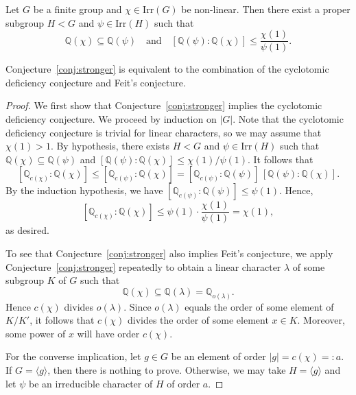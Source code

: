 \documentclass[10pt,a4paper]{amsart}
\newcommand{\Irr}{{\mathrm {Irr}}}
\newcommand{\QQ}{{\mathbb Q}}
\begin{document}
\begin{conjecture}\label{conj:stronger}
Let $G$ be a finite group and $\chi\in\Irr(G)$ be non-linear. Then
there exist a proper subgroup $H<G$ and $\psi\in\Irr(H)$ such that
\[
\QQ(\chi) \subseteq \QQ(\psi) \quad \text{and} \quad [\QQ(\psi) :
\QQ(\chi)] \le \frac{\chi(1)}{\psi(1)}.
\]
\end{conjecture}

\begin{proposition}\label{prop:1}
Conjecture~\ref{conj:stronger} is equivalent to the combination of
the cyclotomic deficiency conjecture and Feit's conjecture.
\end{proposition}

\begin{proof}
We first show that Conjecture~\ref{conj:stronger} implies the
cyclotomic deficiency conjecture. We proceed by induction on $|G|$.
Note that the cyclotomic deficiency conjecture is trivial for linear
characters, so we may assume that $\chi(1) > 1$. By hypothesis,
there exists $H < G$ and $\psi \in \Irr(H)$ such that $\QQ(\chi)
\subseteq \QQ(\psi)$ and $[\QQ(\psi) : \QQ(\chi)] \le
\chi(1)/\psi(1)$. It follows that
\[
[\QQ_{c(\chi)} : \QQ(\chi)] \le [\QQ_{c(\psi)} : \QQ(\chi)] =
[\QQ_{c(\psi)} : \QQ(\psi)] \, [\QQ(\psi) : \QQ(\chi)].
\]
By the induction hypothesis, we have $[\QQ_{c(\psi)} : \QQ(\psi)]
\le \psi(1)$. Hence,
\[
[\QQ_{c(\chi)} : \QQ(\chi)] \le \psi(1) \cdot
\frac{\chi(1)}{\psi(1)} = \chi(1),
\]
as desired.

To see that Conjecture~\ref{conj:stronger} also implies Feit's
conjecture, we apply Conjecture~\ref{conj:stronger} repeatedly to
obtain a linear character $\lambda$ of some subgroup $K$ of $G$ such
that
\[
\mathbb{Q}(\chi) \subseteq \mathbb{Q}(\lambda) =
\mathbb{Q}_{o(\lambda)}.
\]
Hence $c(\chi)$ divides $o(\lambda)$. Since $o(\lambda)$ equals the
order of some element of $K/K'$, it follows that $c(\chi)$ divides
the order of some element $x \in K$. Moreover, some power of $x$
will have order $c(\chi)$.


For the converse implication, let $g \in G$ be an element of order
$|g| = c(\chi) =: a$. If $G = \langle g \rangle$, then there is
nothing to prove. Otherwise, we may take $H = \langle g \rangle$ and
let $\psi$ be an irreducible character of $H$ of order $a$.
\end{proof}
\end{document}
